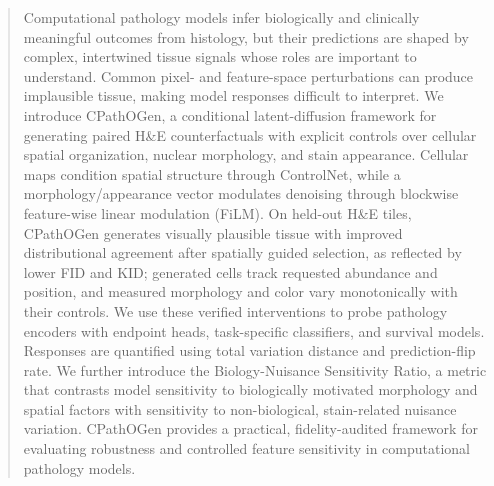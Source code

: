 \begin{abstract}
Computational pathology models infer biologically and clinically meaningful outcomes from histology, but their predictions are shaped by complex, intertwined tissue signals whose roles are important to understand. Common pixel- and feature-space perturbations can produce implausible tissue, making model responses difficult to interpret. We introduce CPathOGen, a conditional latent-diffusion framework for generating paired H\&E counterfactuals with explicit controls over cellular spatial organization, nuclear morphology, and stain appearance. Cellular maps condition spatial structure through ControlNet, while a morphology/appearance vector modulates denoising through blockwise feature-wise linear modulation (FiLM). On held-out H\&E tiles, CPathOGen generates visually plausible tissue with improved distributional agreement after spatially guided selection, as reflected by lower FID and KID; generated cells track requested abundance and position, and measured morphology and color vary monotonically with their controls. We use these verified interventions to probe pathology encoders with endpoint heads, task-specific classifiers, and survival models. Responses are quantified using total variation distance and prediction-flip rate. We further introduce the Biology-Nuisance Sensitivity Ratio, a metric that contrasts model sensitivity to biologically motivated morphology and spatial factors with sensitivity to non-biological, stain-related nuisance variation. CPathOGen provides a practical, fidelity-audited framework for evaluating robustness and controlled feature sensitivity in computational pathology models.
\end{abstract}




